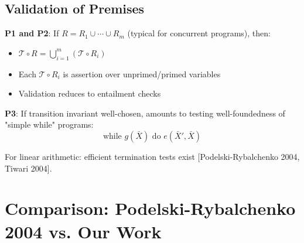 \documentclass{article}
\begin{document}
\subsection{Validation of Premises}

\textbf{P1 and P2}: If $R = R_1 \cup \cdots \cup R_m$ (typical for concurrent programs), then:
\begin{itemize}
    \item $\mathcal{T} \circ R = \bigcup_{i=1}^m (\mathcal{T} \circ R_i)$
    \item Each $\mathcal{T} \circ R_i$ is assertion over unprimed/primed variables
    \item Validation reduces to entailment checks
\end{itemize}

\textbf{P3}: If transition invariant well-chosen, amounts to testing well-foundedness of "simple while" programs:
\begin{equation}
\text{while } g(\bar{X}) \text{ do } e(\bar{X}', \bar{X})
\end{equation}

For linear arithmetic: efficient termination tests exist [Podelski-Rybalchenko 2004, Tiwari 2004].

\section{Comparison: Podelski-Rybalchenko 2004 vs. Our Work}
\end{document}

